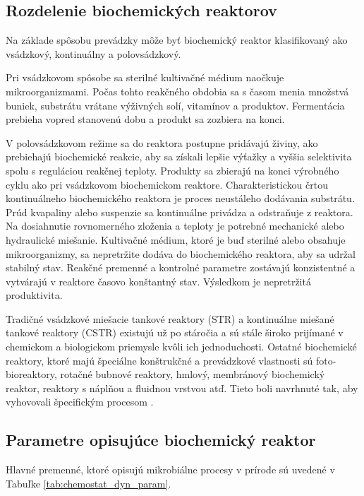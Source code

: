 \subsection{Rozdelenie biochemických reaktorov}
Na základe spôsobu prevádzky môže byť biochemický reaktor klasifikovaný ako vsádzkový, kontinuálny a polovsádzkový.
 
Pri vsádzkovom spôsobe sa sterilné kultivačné médium naočkuje mikroorganizmami. Počas tohto reakčného obdobia sa s časom menia množstvá buniek, substrátu vrátane výživných solí, vitamínov a produktov. Fermentácia prebieha vopred stanovenú dobu a produkt sa zozbiera na konci.

V polovsádzkovom režime sa do reaktora postupne pridávajú živiny, ako prebiehajú biochemické reakcie, aby sa získali lepšie výťažky a vyššia selektivita spolu s reguláciou reakčnej teploty. Produkty sa zbierajú na konci výrobného cyklu ako pri vsádzkovom biochemickom reaktore. Charakteristickou črtou kontinuálneho biochemického reaktora je proces neustáleho dodávania substrátu. Prúd kvapaliny alebo suspenzie sa kontinuálne privádza a odstraňuje z reaktora. Na dosiahnutie rovnomerného zloženia a teploty je potrebné mechanické alebo hydraulické miešanie. Kultivačné médium, ktoré je buď sterilné alebo obsahuje mikroorganizmy, sa nepretržite dodáva do biochemického reaktora, aby sa udržal stabilný stav. Reakčné premenné a kontrolné parametre zostávajú konzistentné a vytvárajú v reaktore časovo konštantný stav. Výsledkom je nepretržitá produktivita.

Tradičné vsádzkové miešacie tankové reaktory (STR) a kontinuálne miešané tankové reaktory (CSTR) existujú už po stáročia a sú stále široko prijímané v chemickom a biologickom priemysle kvôli ich jednoduchosti. Ostatné biochemické reaktory, ktoré majú špeciálne konštrukčné a prevádzkové vlastnosti sú foto-bioreaktory, rotačné bubnové reaktory, hmlový, membránový biochemický reaktor, reaktory s náplňou a fluidnou vrstvou atď. Tieto boli navrhnuté tak, aby vyhovovali špecifickým procesom \cite{kaushik:bioreactors:2014}.

\subsection{Parametre opisujúce biochemický reaktor}
Hlavné premenné, ktoré opisujú mikrobiálne procesy v prírode sú uvedené v Tabuľke \ref{tab:chemostat_dyn_param}.

